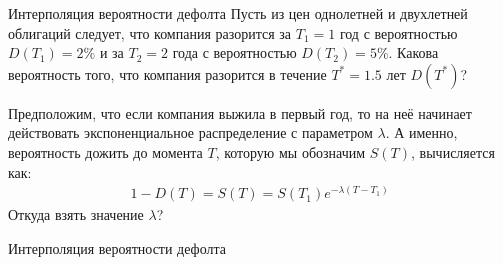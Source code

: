 \documentclass{beamer}
\begin{document}
\begin{frame}{Интерполяция вероятности дефолта}
\justify
Пусть из цен однолетней и двухлетней облигаций следует, что компания разорится за $T_1=1$ год с вероятностью $D(T_1) = 2\%$ и за $T_2=2$ года с вероятностью $D(T_2) = 5\%$. Какова вероятность того, что компания разорится в течение $T^{*} = 1.5$ лет $D(T^{*})$?

\justify
Предположим, что если компания выжила в первый год, то на неё начинает действовать экспоненциальное распределение с параметром $\lambda$. А именно, вероятность дожить до момента $T$, которую мы обозначим $S(T)$, вычисляется как:
\begin{align*}
1 - D(T) = S(T) = S(T_1)e^{-\lambda(T-T_1)}
\end{align*}
Откуда взять значение $\lambda$?
\end{frame}




\newcommand{\nodeWithDropLines}[2]{
    \node[
        circle,
        fill,
        color=Set1-A,
        inner sep=2pt
    ]
    at (axis cs: #1, #2)
    {};

    \draw[
        dashed,
        thick
    ]
    (axis cs: 0, #2) -- (axis cs: #1, #2) -- (axis cs: #1, 0);
}

\begin{frame}{Интерполяция вероятности дефолта}
\centering
{}
\end{frame}
\end{document}
